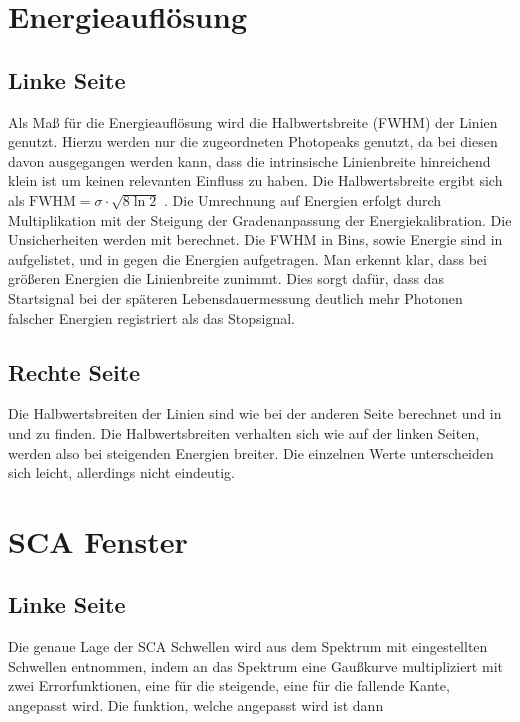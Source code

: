 \section{Energieauflösung}
\label{sec:linienbreite}
\subsection*{Linke Seite}
Als Maß für die Energieauflösung wird die Halbwertsbreite (FWHM) der Linien genutzt. Hierzu werden nur die zugeordneten Photopeaks genutzt, da bei diesen davon ausgegangen werden kann, dass die intrinsische Linienbreite hinreichend klein ist um keinen relevanten Einfluss zu haben. Die Halbwertsbreite ergibt sich als $\text{FWHM} = \sigma \cdot \sqrt{8 \ln{2}}$ \cite[8]{ex_techniques}. Die Umrechnung auf Energien erfolgt durch Multiplikation mit der Steigung der Gradenanpassung der Energiekalibration. Die Unsicherheiten werden mit  berechnet. Die FWHM in Bins, sowie Energie sind in  aufgelistet, und in  gegen die Energien aufgetragen. Man erkennt klar, dass bei größeren Energien die Linienbreite zunimmt. Dies sorgt dafür, dass das Startsignal bei der späteren Lebensdauermessung deutlich mehr Photonen falscher Energien registriert als das Stopsignal.


\subsection*{Rechte Seite}
Die Halbwertsbreiten der Linien sind wie bei der anderen Seite berechnet und in  und  zu finden. Die Halbwertsbreiten verhalten sich wie auf der linken Seiten, werden also bei steigenden Energien breiter. Die einzelnen Werte unterscheiden sich leicht, allerdings nicht eindeutig.

\section{SCA Fenster}
\label{sec:sca-fenster}
\subsection*{Linke Seite}
Die genaue Lage der SCA Schwellen wird aus dem Spektrum mit eingestellten Schwellen entnommen, indem an das Spektrum eine Gaußkurve multipliziert mit zwei Errorfunktionen, eine für die steigende, eine für die fallende Kante, angepasst wird. Die funktion, welche angepasst wird ist dann

